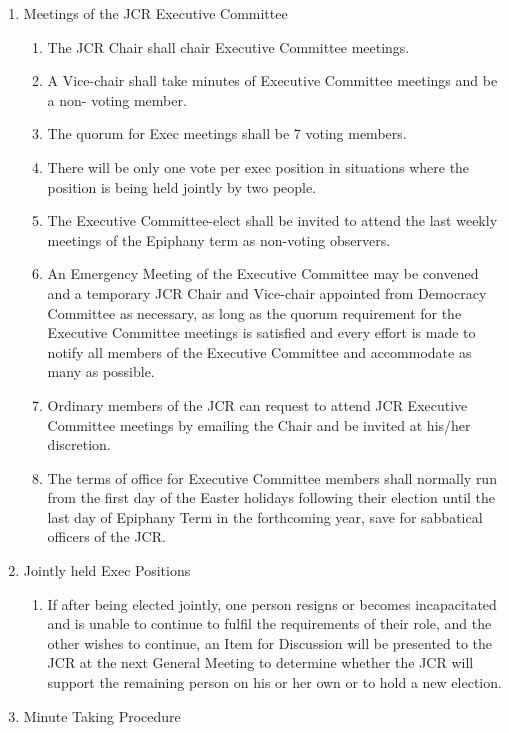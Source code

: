 \begin{enumerate}
    \item Meetings of the JCR Executive Committee
    \begin{enumerate}
        \item The JCR Chair shall chair Executive Committee meetings.
        \item A Vice-chair shall take minutes of Executive Committee meetings and be a non- voting member.
        \item The quorum for Exec meetings shall be 7 voting members.
        \item There will be only one vote per exec position in situations where the position is being held jointly by two people.
        \item The Executive Committee-elect shall be invited to attend the last weekly meetings of the Epiphany term as non-voting observers.
        \item An Emergency Meeting of the Executive Committee may be convened and a temporary JCR Chair and Vice-chair appointed from Democracy Committee as necessary, as long as the quorum requirement for the Executive Committee meetings is satisfied and every effort is made to notify all members of the Executive Committee and accommodate as many as possible.
        \item Ordinary members of the JCR can request to attend JCR Executive Committee meetings by emailing the Chair and be invited at his/her discretion.
        \item The terms of office for Executive Committee members shall normally run from the first day of the Easter holidays following their election until the last day of Epiphany Term in the forthcoming year, save for sabbatical officers of the JCR. 
    \end{enumerate}
    \item Jointly held Exec Positions
    \begin{enumerate}
        \item If after being elected jointly, one person resigns or becomes incapacitated and is unable to continue to fulfil the requirements of their role, and the other wishes to continue, an Item for Discussion will be presented to the JCR at the next General Meeting to determine whether the JCR will support the remaining person on his or her own or to hold a new election.
    \end{enumerate}
    \item Minute Taking Procedure
    \begin{enumerate}

\end{enumerate}
\end{enumerate}
